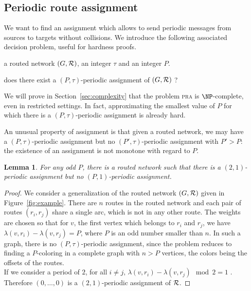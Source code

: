 \documentclass[10pt, conference, letterpaper]{IEEEtran}
\newtheorem{lemma}[theorem]{Lemma}
\newcommand\pra{\textsc{pra}\xspace}
\begin{document}
      \subsection{Periodic route assignment}\label{nonmonotone}

    We want to find an assignment which allows to send periodic messages from sources to targets
    without collisions. We introduce the following associated decision problem, useful for hardness proofs.
    

      \noindent {\bf  Periodic Routes Assignment (\pra)} 

       a routed network $(G,\cal R)$, an integer $\tau$ and an integer $P$.

       does there exist a $(P,\tau)$-periodic assignment of $(G,\cal R)$ ?


      We will prove in Section~\ref{sec:complexity} that the problem \pra is $\NP$-complete, even in restricted settings.
      In fact, approximating the smallest value of $P$ for which there is a $(P,\tau)$-periodic assignment is already hard.
      
      An unusual property of assignment is that given a routed network, we may have a $(P,\tau)$-periodic assignment but no
      $(P',\tau)$-periodic assignment with $P' > P$: the existence of an assignment is not monotone with regard to $P$.

	\begin{lemma} \label{lemma:monotonic}
	 For any odd $P$, there is a routed network such that there is a $(2,1)$-periodic assignment but no $(P,1)$-periodic assignment.
	\end{lemma}
\begin{proof}

      We consider a generalization of the routed network $(G,{\cal R})$ given in Figure~\ref{fig:example}. 
      There are $n$ routes in the routed network and each pair of routes $(r_i,r_j)$ share a single arc, which is not in any other route. The weights are chosen so that for $v$, the first vertex which belongs to $r_i$ and $r_j$, we have $\lambda(v,r_i) - \lambda(v,r_j)= P$, where $P$ is an odd number smaller than $n$. In such a graph, there is no $(P,\tau)$-periodic assignment, since the problem reduces to finding a $P$-coloring in a complete graph with $n > P$ vertices, the colors being the offsets of the routes.\\
      If we consider a period of $2$, for all $i \neq j$, $\lambda(v,r_i) - \lambda(v,r_j) \mod 2 = 1$ . Therefore $(0,\dots,0)$ is a $(2,1)$-periodic assignment of ${\cal R}$.      
\end{proof}
      
\end{document}
